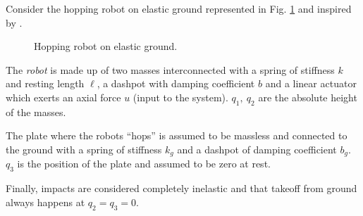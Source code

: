 \begin{exmp}\label{ex:hopping}
    Consider the hopping robot on elastic ground represented in Fig. \ref{fig:hopping} and inspired by \cite{Ishikawa2003}.
    \begin{figure}[h]
        \centering
        
        \caption[Hopping robot on elastic ground]{Hopping robot on elastic ground. }
        \label{fig:hopping}
    \end{figure}
    The \textit{robot} is made up of two masses interconnected with a spring of stiffness $k$ and resting length $\ell$, a dashpot with damping coefficient $b$ and a linear actuator which exerts an axial force $u$ (input to the system). 
    $q_1,~q_2$ are the absolute height of the masses.
    
    The plate where the robots ``hops'' is assumed to be massless and connected to the ground with a spring of stiffness $k_g$ and a dashpot of damping coefficient $b_g$.
    $q_3$ is the position of the plate and assumed to be zero at rest.
    
    Finally, impacts are considered completely inelastic and that takeoff from ground always happens at $q_2 = q_3 = 0$.
    

\end{exmp}
